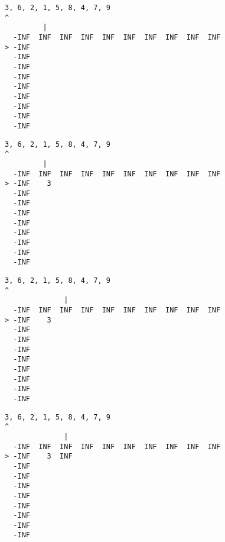 { \begin{verbatim}
3, 6, 2, 1, 5, 8, 4, 7, 9
^
         |
  -INF  INF  INF  INF  INF  INF  INF  INF  INF  INF
> -INF                                             
  -INF                                             
  -INF                                             
  -INF                                             
  -INF                                             
  -INF                                             
  -INF                                             
  -INF                                             
  -INF                                             
\end{verbatim} }

{ \begin{verbatim}
3, 6, 2, 1, 5, 8, 4, 7, 9
^
         |
  -INF  INF  INF  INF  INF  INF  INF  INF  INF  INF
> -INF    3                                        
  -INF                                             
  -INF                                             
  -INF                                             
  -INF                                             
  -INF                                             
  -INF                                             
  -INF                                             
  -INF                                             
\end{verbatim} }

{ \begin{verbatim}
3, 6, 2, 1, 5, 8, 4, 7, 9
^
              |
  -INF  INF  INF  INF  INF  INF  INF  INF  INF  INF
> -INF    3                                        
  -INF                                             
  -INF                                             
  -INF                                             
  -INF                                             
  -INF                                             
  -INF                                             
  -INF                                             
  -INF                                             
\end{verbatim} }

{ \begin{verbatim}
3, 6, 2, 1, 5, 8, 4, 7, 9
^
              |
  -INF  INF  INF  INF  INF  INF  INF  INF  INF  INF
> -INF    3  INF                                   
  -INF                                             
  -INF                                             
  -INF                                             
  -INF                                             
  -INF                                             
  -INF                                             
  -INF                                             
  -INF                                             
\end{verbatim} }

